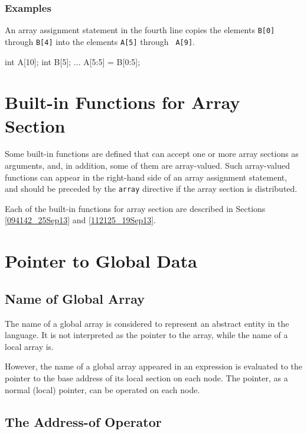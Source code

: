 \subsubsection*{Examples}

An array assignment statement in the fourth line copies the elements
{\tt B[0]} through {\tt B[4]} into the elements {\tt A[5]} through {\tt
A[9]}.

\hspace{\hsize}
\begin{XCexample}
int A[10];
int B[5];
    ...
A[5:5] = B[0:5]; 
\end{XCexample}


\section{Built-in Functions for Array Section}

Some built-in functions are defined that can accept one or more array
sections as arguments, and, in addition, some of them are array-valued.
%
Such array-valued functions can appear in the right-hand side of an
array assignment statement, and should be preceded by the {\tt array}
directive if the array section is distributed.

Each of the built-in functions for array section are described in
Sections \ref{094142_25Sep13} and \ref{112125_19Sep13}.


\section{Pointer to Global Data}
\label{sec:pointer to global data}

\subsection{Name of Global Array}

The name of a global array is considered to represent an abstract entity
in the {\XMP} language. It is not interpreted as the pointer to the array,
while the name of a local array is.

However, the name of a global array appeared in an expression is
evaluated to the pointer to the base address of its local section on
each node. The pointer, as a normal (local) pointer, can be operated on
each node.

\subsection{The Address-of Operator}

